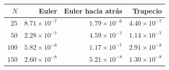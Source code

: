 \begin{tabular}{r r r r}
\toprule
\rowcolor{Azul1!50}
$N$ & Euler & Euler hacia atrás & Trapecio \\
\midrule
$25$ & $8.71\times10^{-7}$ & $1.79\times10^{-6}$ & $4.40\times10^{-7}$ \\
$50$ & $2.28\times10^{-7}$ & $4.59\times10^{-7}$ & $1.14\times10^{-7}$ \\
$100$ & $5.82\times10^{-8}$ & $1.17\times10^{-7}$ & $2.91\times10^{-8}$ \\
$150$ & $2.60\times10^{-8}$ & $5.21\times10^{-8}$ & $1.30\times10^{-8}$ \\
\bottomrule
\end{tabular}
